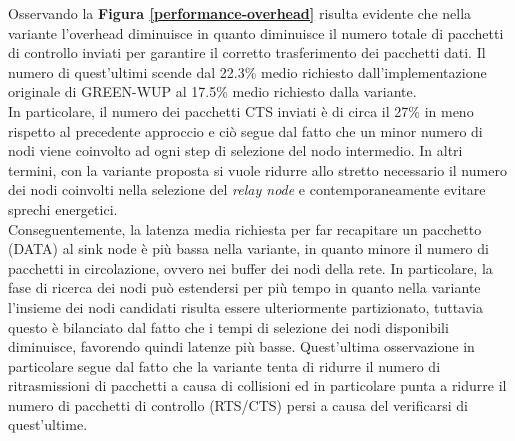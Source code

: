 \documentclass[binding=0.6cm,TFA]{sapthesis}
\begin{document}
Osservando la \textbf{Figura \ref{performance-overhead}} risulta evidente che nella variante l'overhead diminuisce in quanto diminuisce il numero totale di pacchetti di
controllo inviati per garantire il corretto trasferimento dei pacchetti dati. Il numero di quest'ultimi scende dal 22.3\% medio richiesto
dall'implementazione originale di GREEN-WUP al 17.5\% medio richiesto dalla variante.\\

In particolare, il numero dei pacchetti CTS inviati è di circa il 27\% in meno rispetto al precedente approccio e ciò segue dal fatto che un minor
numero di nodi viene coinvolto ad ogni step di selezione del nodo intermedio. In altri termini, con la variante proposta si vuole ridurre allo stretto
necessario il numero dei nodi coinvolti nella selezione del \emph{relay node} e contemporaneamente evitare sprechi energetici.\\

Conseguentemente, la latenza media richiesta per far recapitare un pacchetto (DATA) al sink node è più bassa nella variante, in quanto minore il
numero di pacchetti in circolazione, ovvero nei buffer dei nodi della rete. In particolare, la fase di ricerca dei nodi può estendersi per più tempo
in quanto nella variante l'insieme dei nodi candidati risulta essere ulteriormente partizionato, tuttavia questo è bilanciato dal fatto che i tempi
di selezione dei nodi disponibili diminuisce, favorendo quindi latenze più basse. Quest'ultima osservazione in particolare segue dal fatto che la variante
tenta di ridurre il numero di ritrasmissioni di pacchetti a causa di collisioni ed in particolare punta a ridurre il numero di pacchetti di controllo
(RTS/CTS) persi a causa del verificarsi di quest'ultime.\\
\end{document}
